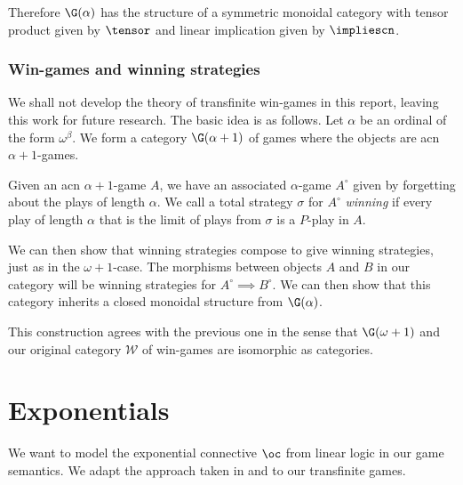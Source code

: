 \documentclass[11pt]{article} %
\begin{document}
Therefore $\G(\alpha)$ has the structure of a symmetric monoidal category with tensor product given by $\tensor$ and linear implication given by $\impliescn$.  

\subsubsection{Win-games and winning strategies}

We shall not develop the theory of transfinite win-games in this report, leaving this work for future research.  The basic idea is as follows.  Let $\alpha$ be an ordinal of the form $\omega^\beta$.  We form a category $\G(\alpha+1)$ of games where the objects are acn $\alpha+1$-games.  

Given an acn $\alpha+1$-game $A$, we have an associated $\alpha$-game $A^\circ$ given by forgetting about the plays of length $\alpha$.  We call a total strategy $\sigma$ for $A^\circ$ \emph{winning} if every play of length $\alpha$ that is the limit of plays from $\sigma$ is a $P$-play in $A$.  

We can then show that winning strategies compose to give winning strategies, just as in the $\omega+1$-case.  The morphisms between objects $A$ and $B$ in our category will be winning strategies for $A^\circ\implies B^\circ$.  We can then show that this category inherits a closed monoidal structure from $\G(\alpha)$.  

This construction agrees with the previous one in the sense that $\G(\omega+1)$ and our original category $\mathcal W$ of win-games are isomorphic as categories.  

\section{Exponentials}

We want to model the exponential connective $\oc$ from linear logic in our game semantics.  We adapt the approach taken in \cite{laird02} and \cite{martinsthesis} to our transfinite games.
\end{document}
